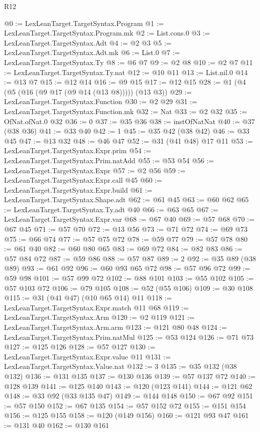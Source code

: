 \begin{lexlean}{R12}
\begin{coremodule}
{{{{{{{{@0 := LexLeanTarget.TargetSyntax.Program
@1 := LexLeanTarget.TargetSyntax.Program.mk
@2 := List.cons.{0}
@3 := LexLeanTarget.TargetSyntax.Adt
@4 := @2 @3
@5 := LexLeanTarget.TargetSyntax.Adt.mk
@6 := List.{0}
@7 := LexLeanTarget.TargetSyntax.Ty
@8 := @6 @7
@9 := @2 @8
@10 := @2 @7
@11 := LexLeanTarget.TargetSyntax.Ty.nat
@12 := @10 @11
@13 := List.nil.{0}
@14 := @13 @7
@15 := @12 @14
@16 := @9 @15
@17 := @12 @15
@28 := @1 (@4 (@5 (@16 (@9 @17 (@9 @14 (@13 @8))))) (@13 @3))
@29 := LexLeanTarget.TargetSyntax.Function
@30 := @2 @29
@31 := LexLeanTarget.TargetSyntax.Function.mk
@32 := Nat
@33 := @2 @32
@35 := OfNat.ofNat.{0} @32
@36 := 0
@37 := @35 @36
@38 := instOfNatNat
@40 := @37 (@38 @36)
@41 := @33 @40
@42 := 1
@45 := @35 @42 (@38 @42)
@46 := @33 @45
@47 := @13 @32
@48 := @46 @47
@52 := @31 (@41 @48) @17 @11
@53 := LexLeanTarget.TargetSyntax.Expr.prim
@54 := LexLeanTarget.TargetSyntax.Prim.natAdd
@55 := @53 @54
@56 := LexLeanTarget.TargetSyntax.Expr
@57 := @2 @56
@59 := LexLeanTarget.TargetSyntax.Expr.call @45
@60 := LexLeanTarget.TargetSyntax.Expr.build
@61 := LexLeanTarget.TargetSyntax.Shape.adt
@62 := @61 @45
@63 := @60 @62
@65 := LexLeanTarget.TargetSyntax.Ty.adt @40
@66 := @63 @65
@67 := LexLeanTarget.TargetSyntax.Expr.var
@68 := @67 @40
@69 := @57 @68
@70 := @67 @45
@71 := @57 @70
@72 := @13 @56
@73 := @71 @72
@74 := @69 @73
@75 := @66 @74
@77 := @57 @75 @72
@78 := @59 @77
@79 := @57 @78
@80 := @61 @40
@82 := @60 @80 @65
@83 := @69 @72
@84 := @82 @83
@86 := @57 @84 @72
@87 := @59 @86
@88 := @57 @87
@89 := 2
@92 := @35 @89 (@38 @89)
@93 := @61 @92
@96 := @60 @93 @65 @72
@98 := @57 @96 @72
@99 := @59 @98
@101 := @57 @99 @72
@102 := @88 @101
@103 := @55 @102
@105 := @57 @103 @72
@106 := @79 @105
@108 := @52 (@55 @106)
@109 := @30 @108
@115 := @31 (@41 @47) (@10 @65 @14) @11
@118 := LexLeanTarget.TargetSyntax.Expr.match @11 @68
@119 := LexLeanTarget.TargetSyntax.Arm
@120 := @2 @119
@121 := LexLeanTarget.TargetSyntax.Arm.arm
@123 := @121 @80 @48
@124 := LexLeanTarget.TargetSyntax.Prim.natMul
@125 := @53 @124
@126 := @71 @73
@127 := @125 @126
@128 := @57 @127
@130 := LexLeanTarget.TargetSyntax.Expr.value @11
@131 := LexLeanTarget.TargetSyntax.Value.nat
@132 := 3
@135 := @35 @132 (@38 @132)
@136 := @131 @135
@137 := @130 @136
@139 := @57 @137 @72
@140 := @128 @139
@141 := @125 @140
@143 := @120 (@123 @141)
@144 := @121 @62
@148 := @33 @92 (@33 @135 @47)
@149 := @144 @148
@150 := @67 @92
@151 := @57 @150
@152 := @67 @135
@154 := @57 @152 @72
@155 := @151 @154
@156 := @125 @155
@158 := @120 (@149 @156)
@160 := @121 @93 @47
@161 := @131 @40
@162 := @130 @161
}}}}}}}}
\end{coremodule}
\end{lexlean}
